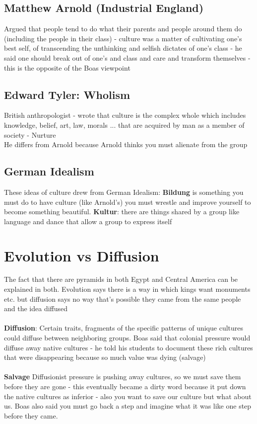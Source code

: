 \documentclass{article}
\begin{document}
\subsection{Matthew Arnold (Industrial England)}
Argued that people tend to do what their parents and people around them do (including the people in their class)  - culture was a matter of cultivating one's best self, of transcending the unthinking and selfish dictates of one's class - he said one should break out of one's and class and care and transform themselves - this is the opposite of the Boas viewpoint

\subsection{Edward Tyler: Wholism}
British anthropologist - wrote that culture is the complex whole which includes knowledge, belief, art, law, morals ... that are acquired by man as a member of society - Nurture \\ 
He differs from Arnold because Arnold thinks you must alienate from the group

\subsection{German Idealism}
These ideas of culture drew from German Idealism: \textbf{Bildung} is something you must do to have culture (like Arnold's) you must wrestle and improve yourself to become something beautiful. \textbf{Kultur}: there are things shared by a group like language and dance that allow a group to express itself

\section{Evolution vs Diffusion}
The fact that there are pyramids in both Egypt and Central America can be explained in both. Evolution says there is a way in which kings want monuments etc. but diffusion says no way that's possible they came from the same people and the idea diffused \\ \\ 
\textbf{Diffusion}: Certain traits, fragments of the specific patterns of unique cultures could diffuse between neighboring groups. Boas said that colonial pressure would diffuse away native cultures - he told his students to document these rich cultures that were disappearing because so much value was dying (salvage) \\  \\ 
\textbf{Salvage} Diffusionist pressure is pushing away cultures, so we must save them before they are gone - this eventually became a dirty word because it put down the native cultures as inferior - also you want to save our culture but what about us. Boas also said you must go back a step and imagine what it was like one step before they came.
\end{document}
